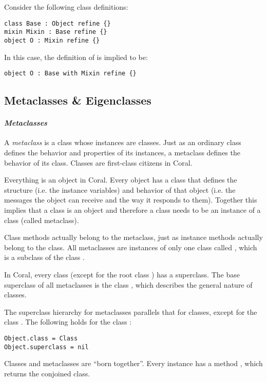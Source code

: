 \example Consider the following class definitions:
\begin{lstlisting}
class Base : Object refine {}
mixin Mixin : Base refine {}
object O : Mixin refine {}
\end{lstlisting}
In this case, the definition of  is implied to be:
\begin{lstlisting}
object O : Base with Mixin refine {}
\end{lstlisting}

\subsection{Metaclasses \& Eigenclasses}
\label{sec:metaclasses}
\label{sec:eigenclasses}

\paragraph{\em Metaclasses}
A {\em metaclass} is a class whose instances are classes. Just as an ordinary class defines the behavior and properties of its instances, a metaclass defines the behavior of its class. Classes are first-class citizens in Coral. 

Everything is an object in Coral. Every object has a class that defines the structure (i.e. the instance variables) and behavior of that object (i.e. the messages the object can receive and the way it responds to them). Together this implies that a class is an object and therefore a class needs to be an instance of a class (called metaclass). 

Class methods actually belong to the metaclass, just as instance methods actually belong to the class. All metaclasses are instances of only one class called , which is a subclass of the class . 

In Coral, every class (except for the root class ) has a superclass. The base superclass of all metaclasses is the class , which describes the general nature of classes. 

The superclass hierarchy for metaclasses parallels that for classes, except for the class . The following holds for the class :
\begin{lstlisting}[deletekeywords={class}]
Object.class = Class
Object.superclass = nil
\end{lstlisting}

Classes and metaclasses are ``born together''. Every  instance has a method , which returns the conjoined class. 

